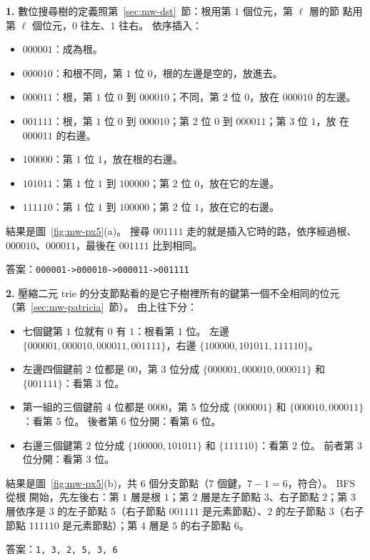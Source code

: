 \textbf{1.} 數位搜尋樹的定義照第~\ref{sec:mw-dst}~節：根用第 $1$ 個位元，第 $\ell$ 層的節
點用第 $\ell$ 個位元，$0$ 往左、$1$ 往右。 依序插入：
\begin{itemize}
\item $000001$：成為根。
\item $000010$：和根不同，第 $1$ 位 $0$，根的左邊是空的，放進去。
\item $000011$：根，第 $1$ 位 $0$ 到 $000010$；不同，第 $2$ 位 $0$，放在 $000010$ 的左邊。
\item $001111$：根，第 $1$ 位 $0$ 到 $000010$；第 $2$ 位 $0$ 到 $000011$；第 $3$ 位 $1$，放
在 $000011$ 的右邊。
\item $100000$：第 $1$ 位 $1$，放在根的右邊。
\item $101011$：第 $1$ 位 $1$ 到 $100000$；第 $2$ 位 $0$，放在它的左邊。
\item $111110$：第 $1$ 位 $1$ 到 $100000$；第 $2$ 位 $1$，放在它的右邊。
\end{itemize}
結果是圖~\ref{fig:mw-px5}(a)。 搜尋 $001111$ 走的就是插入它時的路，依序經過根、
$000010$、$000011$，最後在 $001111$ 比到相同。

答案：\texttt{000001->000010->000011->001111}

\textbf{2.} 壓縮二元 trie 的分支節點看的是它子樹裡所有的鍵第一個不全相同的位元
（第~\ref{sec:mw-patricia}~節）。 由上往下分：
\begin{itemize}
\item 七個鍵第 $1$ 位就有 $0$ 有 $1$：根看第 $1$ 位。 左邊 $\{000001, 000010, 000011,
001111\}$，右邊 $\{100000, 101011, 111110\}$。
\item 左邊四個鍵前 $2$ 位都是 $00$，第 $3$ 位分成 $\{000001, 000010, 000011\}$ 和
$\{001111\}$：看第 $3$ 位。
\item 第一組的三個鍵前 $4$ 位都是 $0000$，第 $5$ 位分成 $\{000001\}$ 和
$\{000010, 000011\}$：看第 $5$ 位。 後者第 $6$ 位分開：看第 $6$ 位。
\item 右邊三個鍵第 $2$ 位分成 $\{100000, 101011\}$ 和 $\{111110\}$：看第 $2$ 位。 前者第
$3$ 位分開：看第 $3$ 位。
\end{itemize}
結果是圖~\ref{fig:mw-px5}(b)，共 $6$ 個分支節點（$7$ 個鍵，$7 - 1 = 6$，符合）。 BFS 從根
開始，先左後右：第 $1$ 層是根 $1$；第 $2$ 層是左子節點 $3$、右子節點 $2$；第 $3$ 層依序是
$3$ 的左子節點 $5$（右子節點 $001111$ 是元素節點）、$2$ 的左子節點 $3$（右子節點 $111110$
是元素節點）；第 $4$ 層是 $5$ 的右子節點 $6$。

答案：\texttt{1, 3, 2, 5, 3, 6}


